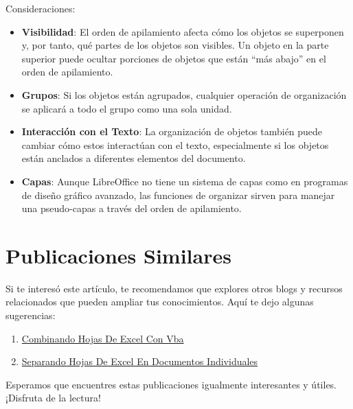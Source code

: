 \documentclass[
  jou,
  floatsintext,
  longtable,
  a4paper,
  nolmodern,
  notxfonts,
  notimes,
  12pt,
  colorlinks=true,linkcolor=blue,citecolor=blue,urlcolor=blue]{apa7}
\providecommand{\tightlist}{%
  \setlength{\itemsep}{0pt}\setlength{\parskip}{0pt}}
\begin{document}
Consideraciones:

\begin{itemize}
\item
  \textbf{Visibilidad}: El orden de apilamiento afecta cómo los objetos
  se superponen y, por tanto, qué partes de los objetos son visibles. Un
  objeto en la parte superior puede ocultar porciones de objetos que
  están ``más abajo'' en el orden de apilamiento.
\item
  \textbf{Grupos}: Si los objetos están agrupados, cualquier operación
  de organización se aplicará a todo el grupo como una sola unidad.
\item
  \textbf{Interacción con el Texto}: La organización de objetos también
  puede cambiar cómo estos interactúan con el texto, especialmente si
  los objetos están anclados a diferentes elementos del documento.
\item
  \textbf{Capas}: Aunque LibreOffice no tiene un sistema de capas como
  en programas de diseño gráfico avanzado, las funciones de organizar
  sirven para manejar una pseudo-capas a través del orden de
  apilamiento.
\end{itemize}

\section{Publicaciones Similares}\label{publicaciones-similares}

Si te interesó este artículo, te recomendamos que explores otros blogs y
recursos relacionados que pueden ampliar tus conocimientos. Aquí te dejo
algunas sugerencias:

\begin{enumerate}
\def\labelenumi{\arabic{enumi}.}
\tightlist
\item
  \href{https://numerus-scriptum.netlify.app/ofimatica/2023-05-31-combinando-hojas-de-excel-con-vba/index.pdf}{}
  \href{https://numerus-scriptum.netlify.app/ofimatica/2023-05-31-combinando-hojas-de-excel-con-vba}{Combinando
  Hojas De Excel Con Vba}
\item
  \href{https://numerus-scriptum.netlify.app/ofimatica/2023-06-05-separando-hojas-de-excel-en-documentos-individuales/index.pdf}{}
  \href{https://numerus-scriptum.netlify.app/ofimatica/2023-06-05-separando-hojas-de-excel-en-documentos-individuales}{Separando
  Hojas De Excel En Documentos Individuales}
\end{enumerate}

Esperamos que encuentres estas publicaciones igualmente interesantes y
útiles. ¡Disfruta de la lectura!
\end{document}
